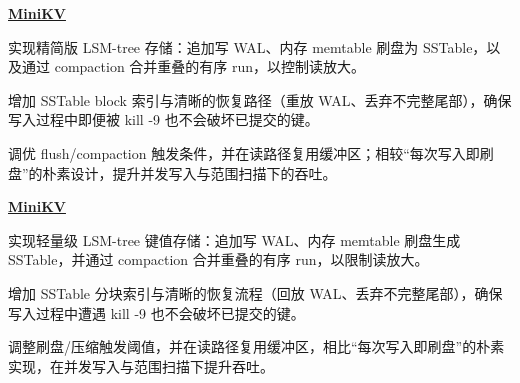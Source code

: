 \begin{twocolentry}{}
\href{https://github.com/faketut/MiniKV}{\textbf{MiniKV}}
\end{twocolentry}
\begin{onecolentry}
\begin{highlights}
\item 实现精简版 LSM-tree 存储：追加写 WAL、内存 memtable 刷盘为 SSTable，以及通过 compaction 合并重叠的有序 run，以控制读放大。
\item 增加 SSTable block 索引与清晰的恢复路径（重放 WAL、丢弃不完整尾部），确保写入过程中即便被 kill -9 也不会破坏已提交的键。
\item 调优 flush/compaction 触发条件，并在读路径复用缓冲区；相较“每次写入即刷盘”的朴素设计，提升并发写入与范围扫描下的吞吐。
\end{highlights}
\end{onecolentry}

\begin{twocolentry}{}
\href{https://github.com/faketut/MiniKV}{\textbf{MiniKV}}
\end{twocolentry}
\begin{onecolentry}
\begin{highlights}
\item 实现轻量级 LSM-tree 键值存储：追加写 WAL、内存 memtable 刷盘生成 SSTable，并通过 compaction 合并重叠的有序 run，以限制读放大。
\item 增加 SSTable 分块索引与清晰的恢复流程（回放 WAL、丢弃不完整尾部），确保写入过程中遭遇 kill -9 也不会破坏已提交的键。
\item 调整刷盘/压缩触发阈值，并在读路径复用缓冲区，相比“每次写入即刷盘”的朴素实现，在并发写入与范围扫描下提升吞吐。
\end{highlights}
\end{onecolentry}
